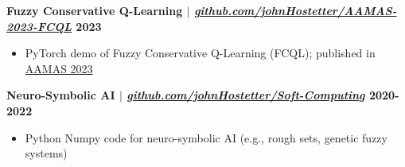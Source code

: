 \documentclass[11pt]{article} %
\begin{document}
\noindent\textbf{Fuzzy Conservative Q-Learning\textsuperscript{\dag}  $|$ \href{https://github.com/johnHostetter/AAMAS-2023-FCQL}{\normalfont\textit{github.com/johnHostetter/AAMAS-2023-FCQL}} \hfill 2023}
\vspace{-6pt}
\begin{itemize}
\setlength\itemsep{-0.5em}
    \item PyTorch demo of Fuzzy Conservative Q-Learning (FCQL); published in \href{https://dl.acm.org/doi/10.5555/3545946.3598770}{AAMAS 2023}
\end{itemize}

\vspace{-4pt}

\noindent\textbf{Neuro-Symbolic AI\textsuperscript{\dag}  $|$ \href{https://github.com/johnHostetter/Soft-Computing}{\normalfont\textit{github.com/johnHostetter/Soft-Computing}} \hfill 2020-2022}
\vspace{-6pt}
\begin{itemize}
\setlength\itemsep{-0.5em}
  \item Python Numpy code for neuro-symbolic AI (e.g., rough sets, genetic fuzzy systems)
\end{itemize}


\vspace{-4pt}

\end{document}
